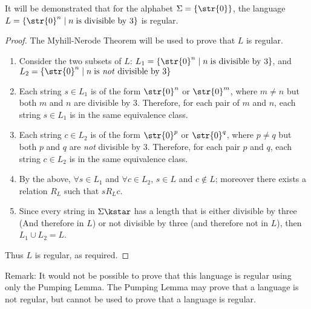 It will be demonstrated that for the alphabet $\Sigma = \{ \str{0} \}$, the language $L = \{ \str{0}^n \mid n \; \text{is divisible by $3$} \}$ is regular.
\begin{proof}
	The Myhill-Nerode Theorem will be used to prove that $L$ is regular.
	\begin{enumerate}[label=\Roman*.]
		\item Consider the two subsets of $L$: $L_1 = \{ \str{0}^n \mid n \; \text{is divisible by $3$} \}$, and $L_2 = \{ \str{0}^n \mid n \; \text{is \emph{not} divisible by $3$} \}$
		\item Each string $s \in L_1$ is of the form $\str{0}^n$ or $\str{0}^m$, where $m \neq n$ but both $m$ and $n$ are divisible by $3$. Therefore, for each pair of $m$ and $n$, each string $s \in L_1$ is in the same equivalence class.
		\item Each string $c \in L_2$ is of the form $\str{0}^p$ or $\str{0}^q$, where $p \neq q$ but both $p$ and $q$ are \emph{not} divisible by $3$. Therefore, for each pair $p$ and $q$, each string $c \in L_2$ is in the same equivalence class.
		\item By the above, $\forall s \in L_1$ and $\forall c \in L_2$, $s \in L$ and $c \notin L$; moreover there exists a relation $R_L$ such that $s R_L c$.
		\item Since every string in $\Sigma\kstar$ has a length that is either divisible by three (And therefore in $L$) or not divisible by three (and therefore not in $L$), then $L_1 \cup L_2 = L$.
	\end{enumerate}
	Thus $L$ is regular, as required.
\end{proof}

Remark: It would not be possible to prove that this language is regular using only the Pumping Lemma. The Pumping Lemma may prove that a language is not regular, but cannot be used to prove that a language is regular.